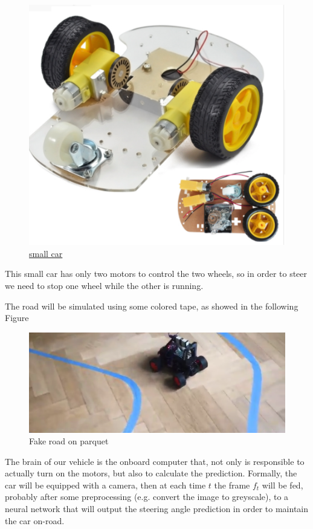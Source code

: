 \documentclass[11pt]{article}
\begin{document}
\begin{figure}[H]
\centering
\includegraphics[scale=0.5]{images/little_car}
\caption{\href{https://it.aliexpress.com/item/Motor-Smart-Robot-Car-Chassis-Kit-Speed-Encoder-Battery-Box-2WD-For-Arduino-Free-Shipping/32766175672.html?spm=a2g0y.search0104.3.127.1fe64471Nd8YgA&ws_ab_test=searchweb0_0,searchweb201602_2_10152_10151_10065_10068_10344_10342_10343_10340_10341_10696_10084_10083_10618_10307_10134_5711215_10313_10059_10534_100031_10103_10624_10623_10622_10621_10620,searchweb201603_25,ppcSwitch_7&algo_expid=3450aa2c-e521-4594-a0c1-4bf8782da265-18&algo_pvid=3450aa2c-e521-4594-a0c1-4bf8782da265&priceBeautifyAB=0}{small car}}	
\label{fig: little_car}
\end{figure}
This small car has only two motors to control the two wheels, so in order to steer we need to stop one wheel while the other is running.

The road will be simulated using some colored tape, as showed in the following Figure
\begin{figure}[h]
\centering
\includegraphics[width=\linewidth]{images/road}
\caption{Fake road on parquet}
\end{figure}
The brain of our vehicle is the onboard computer that, not only is responsible to actually turn on the motors, but also to calculate the prediction. 
Formally, the car will be equipped with a camera, then at each time $t$ the frame $f_t$ will be fed, probably after some preprocessing (e.g. convert the image to greyscale), to a neural network that will output the steering angle prediction in order to maintain the car on-road.
\end{document}
